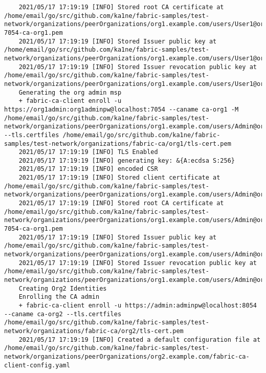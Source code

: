\begin{lstlisting}
    2021/05/17 17:19:19 [INFO] Stored root CA certificate at /home/email/go/src/github.com/ka1ne/fabric-samples/test-network/organizations/peerOrganizations/org1.example.com/users/User1@org1.example.com/msp/cacerts/localhost-7054-ca-org1.pem
    2021/05/17 17:19:19 [INFO] Stored Issuer public key at /home/email/go/src/github.com/ka1ne/fabric-samples/test-network/organizations/peerOrganizations/org1.example.com/users/User1@org1.example.com/msp/IssuerPublicKey
    2021/05/17 17:19:19 [INFO] Stored Issuer revocation public key at /home/email/go/src/github.com/ka1ne/fabric-samples/test-network/organizations/peerOrganizations/org1.example.com/users/User1@org1.example.com/msp/IssuerRevocationPublicKey
    Generating the org admin msp
    + fabric-ca-client enroll -u https://org1admin:org1adminpw@localhost:7054 --caname ca-org1 -M /home/email/go/src/github.com/ka1ne/fabric-samples/test-network/organizations/peerOrganizations/org1.example.com/users/Admin@org1.example.com/msp --tls.certfiles /home/email/go/src/github.com/ka1ne/fabric-samples/test-network/organizations/fabric-ca/org1/tls-cert.pem
    2021/05/17 17:19:19 [INFO] TLS Enabled
    2021/05/17 17:19:19 [INFO] generating key: &{A:ecdsa S:256}
    2021/05/17 17:19:19 [INFO] encoded CSR
    2021/05/17 17:19:19 [INFO] Stored client certificate at /home/email/go/src/github.com/ka1ne/fabric-samples/test-network/organizations/peerOrganizations/org1.example.com/users/Admin@org1.example.com/msp/signcerts/cert.pem
    2021/05/17 17:19:19 [INFO] Stored root CA certificate at /home/email/go/src/github.com/ka1ne/fabric-samples/test-network/organizations/peerOrganizations/org1.example.com/users/Admin@org1.example.com/msp/cacerts/localhost-7054-ca-org1.pem
    2021/05/17 17:19:19 [INFO] Stored Issuer public key at /home/email/go/src/github.com/ka1ne/fabric-samples/test-network/organizations/peerOrganizations/org1.example.com/users/Admin@org1.example.com/msp/IssuerPublicKey
    2021/05/17 17:19:19 [INFO] Stored Issuer revocation public key at /home/email/go/src/github.com/ka1ne/fabric-samples/test-network/organizations/peerOrganizations/org1.example.com/users/Admin@org1.example.com/msp/IssuerRevocationPublicKey
    Creating Org2 Identities
    Enrolling the CA admin
    + fabric-ca-client enroll -u https://admin:adminpw@localhost:8054 --caname ca-org2 --tls.certfiles /home/email/go/src/github.com/ka1ne/fabric-samples/test-network/organizations/fabric-ca/org2/tls-cert.pem
    2021/05/17 17:19:19 [INFO] Created a default configuration file at /home/email/go/src/github.com/ka1ne/fabric-samples/test-network/organizations/peerOrganizations/org2.example.com/fabric-ca-client-config.yaml

\end{lstlisting}
